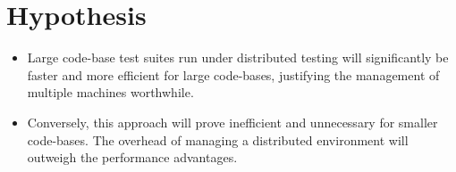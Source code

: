 \documentclass[12pt]{article}
\begin{document}
\section*{Hypothesis}
\begin{itemize}
\item Large code-base test suites run under distributed testing will significantly be faster and more efficient for large code-bases, justifying the management of multiple machines worthwhile.  
\item Conversely, this approach will prove inefficient and unnecessary for smaller code-bases. The overhead of managing a distributed environment will outweigh the performance advantages.
\end{itemize}
\end{document}
